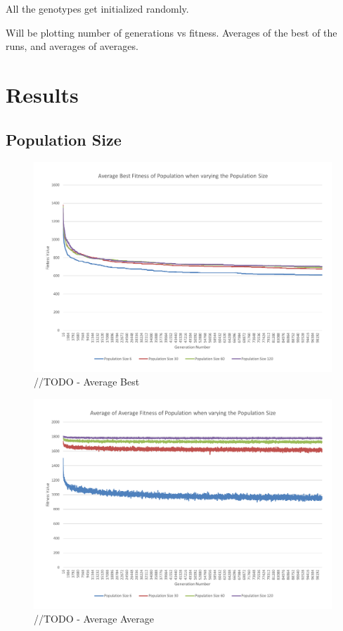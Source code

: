 All the genotypes get initialized randomly.

Will be plotting number of generations vs fitness. Averages of the best of the runs, and averages of averages. 

\section{Results} %
\label{sec:results}

\subsection{Population Size}
\label{sub:population_size)}

\begin{figure}
	\centerline{\includegraphics[width=\paperwidth]{figures/CircleTests/CircleTestsPopulationAverageBest.pdf}}
	\caption{//TODO - Average Best}
\end{figure}

\begin{figure}
	\centerline{\includegraphics[width=\paperwidth]{figures/CircleTests/CircleTestsPopulationAverageAverage.pdf}}
	\caption{//TODO - Average Average}
\end{figure}

